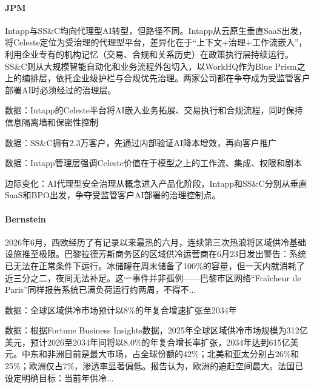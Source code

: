 \documentclass[11pt]{ctexart}
\begin{document}
\paragraph{JPM} Intapp与SS\&C均向代理型AI转型，但路径不同。Intapp从云原生垂直SaaS出发，将Celeste定位为受治理的代理型平台，差异化在于“上下文+治理+工作流嵌入”，利用企业专有的机构记忆（交易、合规和关系历史）在政策执行层持续运行。SS\&C则从大规模智能自动化和业务流程外包切入，以WorkHQ作为Blue Prism之上的编排层，依托企业级护栏与合规优先治理。两家公司都在争夺成为受监管客户部署AI时必须经过的治理层。
{\small\color{refgray}数据：Intapp的Celeste平台将AI嵌入业务拓展、交易执行和合规流程，同时保持信息隔离墙和保密性控制\par}
{\small\color{refgray}数据：SS\&C拥有2.3万客户，先通过内部验证AI降本增效，再向客户推广\par}
{\small\color{refgray}数据：Intapp管理层强调Celeste价值在于模型之上的工作流、集成、权限和剧本\par}
{\small\color{refgray}边际变化：AI代理型安全治理从概念进入产品化阶段，Intapp和SS\&C分别从垂直SaaS和BPO出发，争夺受监管客户AI部署的治理控制点。\par}
\paragraph{Bernstein} 2026年6月，西欧经历了有记录以来最热的六月，连续第三次热浪将区域供冷基础设施推至极限。巴黎拉德芳斯商务区的区域供冷运营商在6月23日发出警告：系统已无法在正常条件下运行。冰储罐在周末储备了100\%的容量，但一天内就消耗了近三分之二，夜间无法补足。这一事件并非孤例——巴黎市区网络“Fraîcheur de Paris”同样报告系统已满负荷运行约两周，不得不...
{\small\color{refgray}数据：全球区域供冷市场预计以8\%的年复合增速扩张至2034年\par}
{\small\color{refgray}数据：根据Fortune Business Insights数据，2025年全球区域供冷市场规模为312亿美元，预计2026至2034年间将以8.0\%的年复合增长率扩张，2034年达到615亿美元。中东和非洲目前是最大市场，占全球份额的42\%；北美和亚太分别占26\%和25\%；欧洲仅占7\%，渗透率显著偏低。报告认为，欧洲的追赶空间最大。法国已设定明确目标：当前年供冷...\par}
\end{document}
